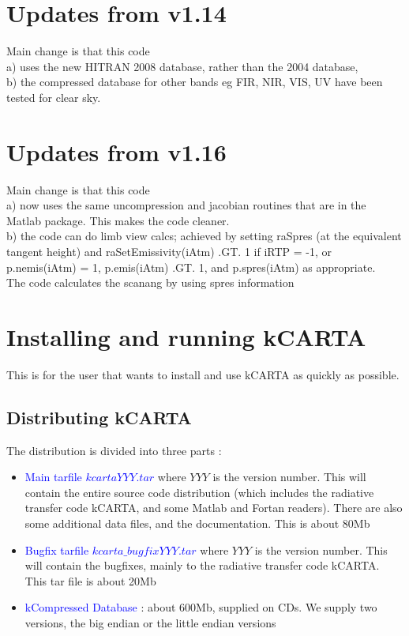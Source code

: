 \documentclass[12pt]{article}
\newcommand{\kc}{\textsf{kCARTA}\xspace}
\begin{document}
\section{Updates from v1.14}
Main change is that this code \\
a) uses the new HITRAN 2008 database, rather than the 2004 database,\\
b) the compressed database for other bands eg FIR, NIR, VIS, UV have been tested 
   for clear sky.\\

\section{Updates from v1.16}
Main change is that this code \\
a) now uses the same uncompression and jacobian routines that are in the Matlab
   package. This makes the code cleaner. \\
b) the code can do limb view calcs; achieved by setting raSpres (at the equivalent 
   tangent height) and raSetEmissivity(iAtm) .GT. 1 if iRTP = -1, or 
     p.nemis(iAtm) = 1, p.emis(iAtm) .GT. 1, and p.spres(iAtm) as appropriate.\\
   The code calculates the scanang by using spres information

\section{Installing and running \kc}
This is for the user that wants to install and use \kc as quickly as possible. 

\subsection{Distributing \kc}
The distribution is divided into three parts :

\begin{itemize}
\item \textcolor{blue} {Main tarfile $kcartaYYY.tar$} where $YYY$ is the 
version number. This will contain the entire source code distribution (which 
includes the radiative transfer code \kc, and some Matlab and Fortan readers).
There are also some additional data files, and the documentation. This is 
about 80Mb\\
\item \textcolor{blue} {Bugfix tarfile $kcarta\_bugfixYYY.tar$} where $YYY$ 
is the version number.
This will contain the bugfixes, mainly to the radiative transfer code \kc. This
tar file is about 20Mb \\
\item \textcolor{blue} {kCompressed Database} : about 600Mb, supplied on CDs. 
We supply two versions, the big endian or the little endian versions \\
\end{itemize}
\end{document}
